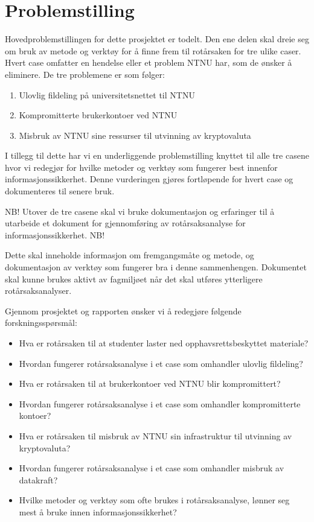 \section{Problemstilling}

\label{sec:problemstilling}
Hovedproblemstillingen for dette prosjektet er todelt. Den ene delen skal dreie seg om bruk av metode og verktøy for å finne frem til rotårsaken for tre ulike caser. Hvert case omfatter en hendelse eller et problem NTNU har, som de ønsker å eliminere. De tre problemene er som følger: 

\begin{enumerate}
    \item Ulovlig fildeling på universitetsnettet til NTNU
    \item Kompromitterte brukerkontoer ved NTNU
    \item Misbruk av NTNU sine ressurser til utvinning av kryptovaluta
\end{enumerate}

I tillegg til dette har vi en underliggende problemstilling knyttet til alle tre casene hvor vi redegjør for hvilke metoder og verktøy som fungerer best innenfor informasjonssikkerhet. Denne vurderingen gjøres fortløpende for hvert case og dokumenteres til senere bruk.

NB! Utover de tre casene skal vi bruke dokumentasjon og erfaringer til å utarbeide et dokument for gjennomføring av rotårsaksanalyse for informasjonssikkerhet. NB! 

Dette skal inneholde informasjon om fremgangsmåte og metode, og dokumentasjon av verktøy som fungerer bra i denne sammenhengen. Dokumentet skal kunne brukes aktivt av fagmiljøet når det skal utføres ytterligere rotårsaksanalyser.

Gjennom prosjektet og rapporten ønsker vi å redegjøre følgende forskningsspørsmål:

\begin{itemize}
    \item Hva er rotårsaken til at studenter laster ned opphavsrettsbeskyttet materiale?
    \item Hvordan fungerer rotårsaksanalyse i et case som omhandler ulovlig fildeling?
    \item Hva er rotårsaken til at brukerkontoer ved NTNU blir kompromittert?
    \item Hvordan fungerer rotårsaksanalyse i et case som omhandler kompromitterte kontoer?
    \item Hva er rotårsaken til misbruk av NTNU sin infrastruktur til utvinning av kryptovaluta?
    \item Hvordan fungerer rotårsaksanalyse i et case som omhandler misbruk av datakraft?
    \item Hvilke metoder og verktøy som ofte brukes i rotårsaksanalyse, lønner seg mest å bruke innen informasjonssikkerhet?
\end{itemize}
